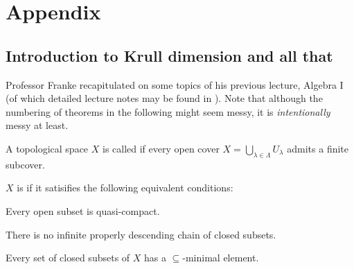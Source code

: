 \documentclass[a4paper,parskip=half,numbers=enddot, DIV=12]{scrreprt}
\begin{document}
\appendix
\chapter{Appendix}
\setcounter{thm}{0}
\renewcommand*{\thethm}{\Alph{thm}}
\section{Introduction to Krull dimension and all that}
Professor Franke recapitulated on some topics of his previous lecture, Algebra I (of which detailed lecture notes may be found in \cite{alg1}). Note that although the numbering of theorems in the following might seem messy, it is \emph{intentionally} messy at least.
\begin{defi}
	A topological space $X$ is called  if every open cover $X = \bigcup_{\lambda\in\Lambda} U_\lambda$ admits a finite subcover.
	
	$X$ is  if it satisifies the following equivalent conditions:
	\begin{alphanumerate}
		\item Every open subset is quasi-compact.
		\item There is no infinite properly descending chain of closed subsets.
		\item Every set of closed subsets of $X$ has a $\subseteq$-minimal element.
	\end{alphanumerate}
\end{defi}
\end{document}
